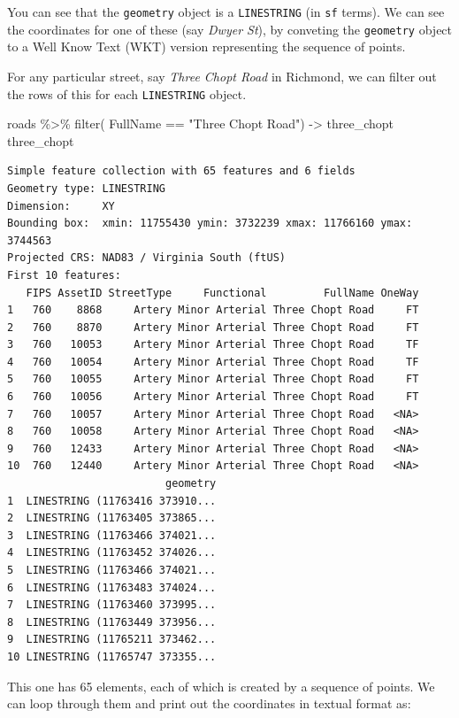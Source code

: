 \documentclass[
  letterpaper,
]{book}
\newenvironment{Shaded}{\begin{snugshade}}{\end{snugshade}}
\newcommand{\FunctionTok}[1]{\textcolor[rgb]{0.28,0.35,0.67}{#1}}
\newcommand{\NormalTok}[1]{\textcolor[rgb]{0.00,0.23,0.31}{#1}}
\newcommand{\OtherTok}[1]{\textcolor[rgb]{0.00,0.23,0.31}{#1}}
\newcommand{\SpecialCharTok}[1]{\textcolor[rgb]{0.37,0.37,0.37}{#1}}
\newcommand{\StringTok}[1]{\textcolor[rgb]{0.13,0.47,0.30}{#1}}
\begin{document}
You can see that the \texttt{geometry} object is a \texttt{LINESTRING}
(in \texttt{sf} terms). We can see the coordinates for one of these (say
\emph{Dwyer St}), by conveting the \texttt{geometry} object to a Well
Know Text (WKT) version representing the sequence of points.

For any particular street, say \emph{Three Chopt Road} in Richmond, we
can filter out the rows of this for each \texttt{LINESTRING} object.

\begin{Shaded}
\begin{Highlighting}[]
\NormalTok{roads }\SpecialCharTok{\%\textgreater{}\%} 
  \FunctionTok{filter}\NormalTok{( FullName }\SpecialCharTok{==} \StringTok{"Three Chopt Road"}\NormalTok{) }\OtherTok{{-}\textgreater{}}\NormalTok{ three\_chopt}
\NormalTok{three\_chopt}
\end{Highlighting}
\end{Shaded}

\begin{verbatim}
Simple feature collection with 65 features and 6 fields
Geometry type: LINESTRING
Dimension:     XY
Bounding box:  xmin: 11755430 ymin: 3732239 xmax: 11766160 ymax: 3744563
Projected CRS: NAD83 / Virginia South (ftUS)
First 10 features:
   FIPS AssetID StreetType     Functional         FullName OneWay
1   760    8868     Artery Minor Arterial Three Chopt Road     FT
2   760    8870     Artery Minor Arterial Three Chopt Road     FT
3   760   10053     Artery Minor Arterial Three Chopt Road     TF
4   760   10054     Artery Minor Arterial Three Chopt Road     TF
5   760   10055     Artery Minor Arterial Three Chopt Road     FT
6   760   10056     Artery Minor Arterial Three Chopt Road     FT
7   760   10057     Artery Minor Arterial Three Chopt Road   <NA>
8   760   10058     Artery Minor Arterial Three Chopt Road   <NA>
9   760   12433     Artery Minor Arterial Three Chopt Road   <NA>
10  760   12440     Artery Minor Arterial Three Chopt Road   <NA>
                         geometry
1  LINESTRING (11763416 373910...
2  LINESTRING (11763405 373865...
3  LINESTRING (11763466 374021...
4  LINESTRING (11763452 374026...
5  LINESTRING (11763466 374021...
6  LINESTRING (11763483 374024...
7  LINESTRING (11763460 373995...
8  LINESTRING (11763449 373956...
9  LINESTRING (11765211 373462...
10 LINESTRING (11765747 373355...
\end{verbatim}

This one has 65 elements, each of which is created by a sequence of
points. We can loop through them and print out the coordinates in
textual format as:
\end{document}
